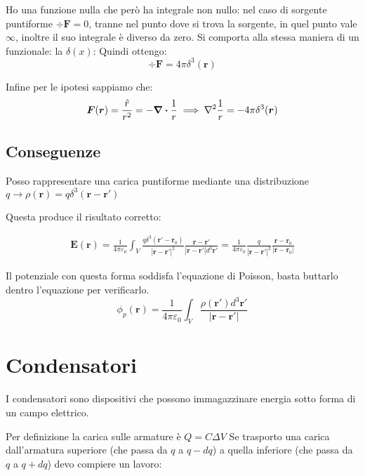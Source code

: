 \documentclass[a4paper]{scrarticle}
\begin{document}
Ho una funzione nulla che però ha integrale non nullo:
nel caso di sorgente puntiforme $\div {\bm F} = 0$, tranne nel punto dove si trova la sorgente, in quel punto vale $\infty$, inoltre il suo integrale è diverso da zero. Si comporta alla stessa maniera di un funzionale: la $\delta(x)$:
Quindi ottengo:
\begin{equation*}
    \div{\bm{F}} = 4\pi \delta^3(\bm r)
\end{equation*}

Infine per le ipotesi sappiamo che:
\begin{equation*}
    \bm F (\bm r) = \frac{\hat r}{r^2} = - \div \frac{1}{r} \implies \laplacian \frac{1}{r} = - 4 \pi \delta ^3 (\bm r)
\end{equation*}

\subsection{Conseguenze}

Posso rappresentare una carica puntiforme mediante una distribuzione $q \to \rho(\bm r) = q\delta^3(\bm r - \bm r')$

Questa produce il risultato corretto:

\begin{gather*}
    \bm E (\bm r) = \frac{1}{4\pi\varepsilon_0}\int_{V} \frac{q \delta^3 (\bm r' - \bm r_0)}{\left|\bm r - \bm r'\right|^2}\frac{\bm r - \bm r'}{\left| \bm r - \bm r '\right| d^3 \bm r'} = \frac{1}{4 \pi \varepsilon_0} \frac{q}{\left|\bm r - \bm r'\right|^2} \frac{\bm r - \bm r_0}{\left|\bm r - \bm r_0\right|}
\end{gather*}

Il potenziale con questa forma soddisfa l'equazione di Poisson, basta buttarlo dentro l'equazione per verificarlo.
\begin{equation}
    \phi_p(\bm r) = \frac{1}{4\pi\varepsilon_0}\int_{V}\frac{\rho(\bm r') d^3\bm r'}{\left|\bm r - \bm r'\right|}
\end{equation}

\section{Condensatori}

I condensatori sono dispositivi che possono immagazzinare energia sotto forma di un campo elettrico.

Per definizione la carica sulle armature è $Q = C \Delta V $
Se trasporto una carica dall'armatura superiore (che passa da $q$ a $q - dq$) a quella inferiore (che passa da $q$ a $q + dq$) devo compiere un lavoro:
\end{document}
